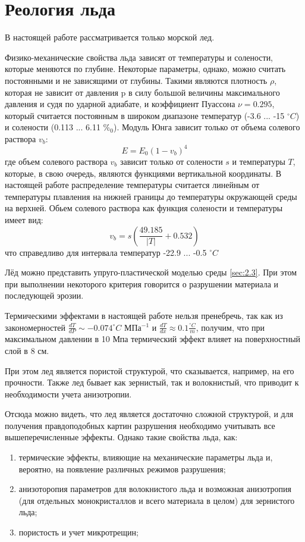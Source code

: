 \documentclass[12pt,a4paper, titlepage, openany]{book}
\begin{document}
\section{Реология льда}
В настоящей работе рассматривается только морской лед.
\par
Физико-механические свойства льда зависят от температуры и солености, которые меняются по глубине. Некоторые параметры, однако, можно считать постоянными и не зависящими от глубины. Такими являются плотность $\rho$, которая не зависит от давления p в силу большой величины максимального давления и судя по ударной адиабате, и коэффициент Пуассона $\nu = 0.295$, который считается постоянным в широком диапазоне температур (-3.6 ... -15 $^{\circ} C$) и солености (0.113 ... 6.11 \%$_0$). Модуль Юнга зависит только от объема солевого раствора $v_b$:
\begin{equation}
E = E_0(1-v_b)^4
\end{equation}
где объем солевого раствора $v_b$ зависит только от солености $s$ и температуры $T$, которые, в свою очередь, являются функциями вертикальной координаты. В настоящей работе распределение температуры считается линейным от температуры плавления на нижней границы до температуры окружающей среды на верхней. Обьем солевого раствора как функция солености и температуры имеет вид:
\begin{equation}
v_b = s(\frac{49.185}{|T|} + 0.532)
\end{equation}
что справедливо для интервала температур -22.9 ... -0.5 $^{\circ} C$
\par
Лёд можно представить упруго-пластической моделью среды \ref{sec:2.3}. При этом при выполнении некоторого критерия говорится о разрушении материала и последующей эрозии. 
\par
Термическими эффектами в настоящей работе нельзя пренебречь, так как из закономерностей $\frac{dT}{dP} \sim -0.074^{\circ} C$ МПа$^{-1}$ и $\frac{dT}{dx} \approx 0.1 \frac{^{\circ} C}{m}$, получим, что при максимальном давлении в 10 Мпа термический эффект влияет на поверхностный слой в 8 см. 
\par 
При этом лед является пористой структурой, что сказывается, например, на его прочности. Также лед бывает как зернистый, так и волокнистый, что приводит к необходимости учета анизотропии.
\par 
Отсюда можно видеть, что лед является достаточно сложной структурой, и для получения правдоподобных картин разрушения необходимо учитывать все вышеперечисленные эффекты. Однако такие свойства льда, как: 
\begin{enumerate}
\item термические эффекты, влияющие на механические параметры льда и, вероятно, на появление различных режимов разрушения;
\item анизоторопия параметров для волокнистого льда и возможная анизотропия (для отдельных монокристаллов и всего материала в целом) для зернистого льда;
\item пористость и учет микротрещин;
\end{enumerate}
\end{document}
